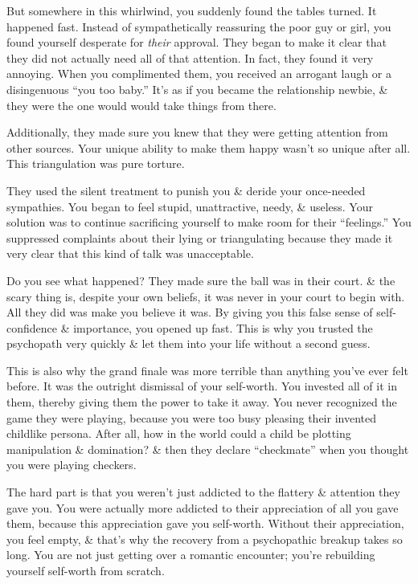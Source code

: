 \documentclass{article}
\numberwithin{equation}{section}
\begin{document}
But somewhere in this whirlwind, you suddenly found the tables turned. It happened fast. Instead of sympathetically reassuring the poor guy or girl, you found yourself desperate for \textit{their} approval. They began to make it clear that they did not actually need all of that attention. In fact, they found it very annoying. When you complimented them, you received an arrogant laugh or a disingenuous ``you too baby.'' It's as if you became the relationship newbie, \& they were the one would would take things from there.

Additionally, they made sure you knew that they were getting attention from other sources. Your unique ability to make them happy wasn't so unique after all. This triangulation was pure torture.

They used the silent treatment to punish you \& deride your once-needed sympathies. You began to feel stupid, unattractive, needy, \& useless. Your solution was to continue sacrificing yourself to make room for their ``feelings.'' You suppressed complaints about their lying or triangulating because they made it very clear that this kind of talk was unacceptable.

Do you see what happened? They made sure the ball was in their court. \& the scary thing is, despite your own beliefs, it was never in your court to begin with. All they did was make you believe it was. By giving you this false sense of self-confidence \& importance, you opened up fast. This is why you trusted the psychopath very quickly \& let them into your life without a second guess.

This is also why the grand finale was more terrible than anything you've ever felt before. It was the outright dismissal of your self-worth. You invested all of it in them, thereby giving them the power to take it away. You never recognized the game they were playing, because you were too busy pleasing their invented childlike persona. After all, how in the world could a child be plotting manipulation \& domination? \& then they declare ``checkmate'' when you thought you were playing checkers.

The hard part is that you weren't just addicted to the flattery \& attention they gave you. You were actually more addicted to their appreciation of all you gave them, because this appreciation gave you self-worth. Without their appreciation, you feel empty, \& that's why the recovery from a psychopathic breakup takes so long. You are not just getting over a romantic encounter; you're rebuilding yourself self-worth from scratch.
\end{document}
